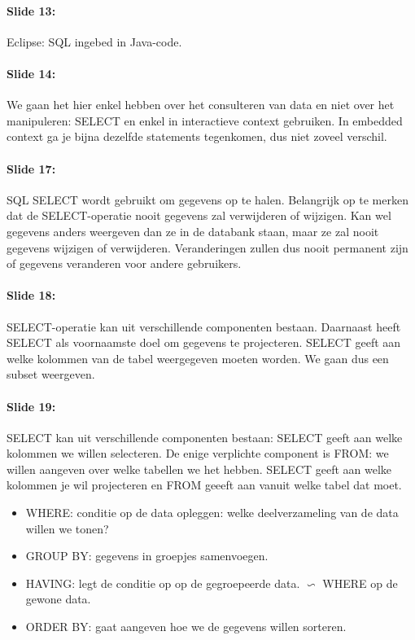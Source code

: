 \documentclass[10pt,a4paper]{report}
\begin{document}
\paragraph{Slide 13:}Eclipse: SQL ingebed in Java-code.

\paragraph{Slide 14:}We gaan het hier enkel hebben over het consulteren van data en niet over het manipuleren: SELECT en enkel in interactieve context gebruiken. In embedded context ga je bijna dezelfde statements tegenkomen, dus niet zoveel verschil.

\paragraph{Slide 17:}SQL SELECT wordt gebruikt om gegevens op te halen. Belangrijk op te merken dat de SELECT-operatie nooit gegevens zal verwijderen of wijzigen. Kan wel gegevens anders weergeven dan ze in de databank staan, maar ze zal nooit gegevens wijzigen of verwijderen. Veranderingen zullen dus nooit permanent zijn of gegevens veranderen voor andere gebruikers.

\paragraph{Slide 18:}SELECT-operatie kan uit verschillende componenten bestaan. Daarnaast heeft SELECT als voornaamste doel om gegevens te projecteren. SELECT geeft aan welke kolommen van de tabel weergegeven moeten worden. We gaan dus een subset weergeven.

\paragraph{Slide 19:}SELECT kan uit verschillende componenten bestaan: SELECT geeft aan welke kolommen we willen selecteren. De enige verplichte component is FROM: we willen aangeven over welke tabellen we het hebben. SELECT geeft aan welke kolommen je wil projecteren en FROM geeeft aan vanuit welke tabel dat moet.
\begin{itemize}
\item WHERE: conditie op de data opleggen: welke deelverzameling van de data willen we tonen?
\item GROUP BY: gegevens in groepjes samenvoegen.
\item HAVING: legt de conditie op op de gegroepeerde data. $\backsim$ WHERE op de gewone data.
\item ORDER BY: gaat aangeven hoe we de gegevens willen sorteren.
\end{itemize}
	
\end{document}
